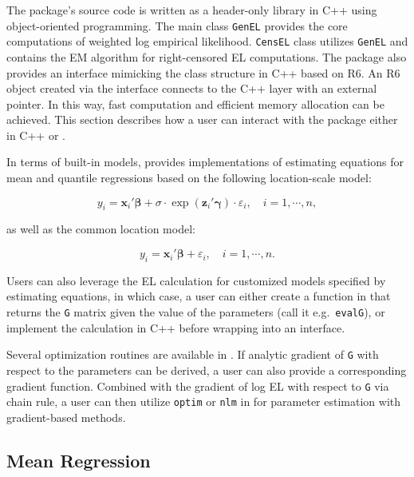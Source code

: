 \documentclass[article]{jss}
\renewcommand{\|}{\,|\,}
\begin{document}
The package's source code is written as a header-only library in C++ using object-oriented programming. The main class \texttt{GenEL} provides the core computations of weighted log empirical likelihood. \texttt{CensEL} class utilizes \texttt{GenEL} and contains the EM algorithm for right-censored EL computations. The package also provides an  interface mimicking the class structure in C++ based on R6. An R6 object created via the  interface connects to the C++ layer with an external pointer. In this way, fast computation and efficient memory allocation can be achieved. This section describes how a user can interact with the package either in C++ or .

In terms of built-in models,  provides implementations of estimating equations for mean and quantile regressions based on the following location-scale model:

\begin{equation} \label{md:lsmod}
  y_i = \bm x_i'\bm \beta+ \sigma\cdot\exp(\bm z_i'\bm \gamma)\cdot\varepsilon_i, \quad i=1,\cdots,n,
\end{equation}

as well as the common location model:

\begin{equation} \label{md:lmod}
  y_i = \bm x_i'\bm \beta+ \varepsilon_i, \quad i=1,\cdots,n.
\end{equation}

Users can also leverage the EL calculation for customized models specified by estimating equations, in which case, a user can either create a function in  that returns the \texttt{G} matrix given the value of the parameters (call it e.g.~\texttt{evalG}), or implement the calculation in C++ before wrapping into an  interface.

Several optimization routines are available in . If analytic gradient of \texttt{G} with respect to the parameters can be derived, a user can also provide a corresponding gradient function. Combined with the gradient of log EL with respect to \texttt{G} via chain rule, a user can then utilize \texttt{optim} or \texttt{nlm} in  for parameter estimation with gradient-based methods.

\hypertarget{mean-regression}{%
\subsection{Mean Regression}\label{mean-regression}}
\end{document}

